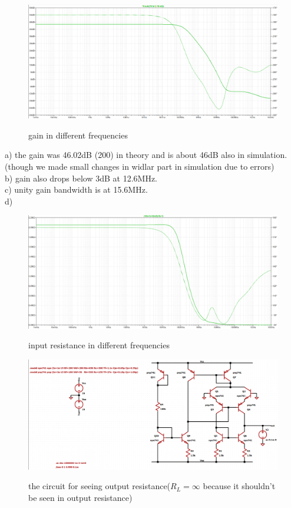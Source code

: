 \documentclass[11pt]{article}
\begin{document}
\begin{figure}[H]
    \begin{center}
        \includegraphics[scale=0.45]{Fig/ac-gain.png}
        \label{fig:ACgain}
        \caption{gain in different frequencies}
    \end{center}
\end{figure}
a) the gain was 46.02dB (200) in theory and is about 46dB also in simulation.(though we made small changes in widlar part in simulation due to errors) \\
b) gain also drops below 3dB at 12.6MHz. \\
c) unity gain bandwidth is at 15.6MHz. \\
d) \\
\begin{figure}[H]
    \begin{center}
        \includegraphics[scale=0.45]{Fig/ac-in-resistance.png}
        \label{fig:ACinResistance}
        \caption{input resistance in different frequencies}
    \end{center}
\end{figure}
\begin{figure}[H]
    \begin{center}
        \includegraphics[scale=0.45]{Fig/ac-outR-circuit.png}
        \label{fig:ACoutRCirc}
        \caption{the circuit for seeing output resistance($R_L = \infty$ because it shouldn't be seen in output resistance)}
    \end{center}
\end{figure}
\end{document}
